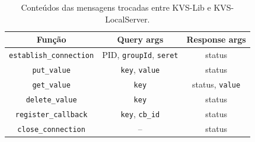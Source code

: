 \begin{table}[ht!]
    \centering
     \caption{Conteúdos das mensagens trocadas entre KVS-Lib e KVS-LocalServer.}
    \begin{tabular}{ccc}
    \hline
         Função &  Query args & Response args\\
         \hline
         \texttt{establish\_connection} & PID, \texttt{groupId}, \texttt{seret} & status \\
         \texttt{put\_value} & \texttt{key}, \texttt{value} & status\\
         \texttt{get\_value} & \texttt{key} & status, \texttt{value} \\
         \texttt{delete\_value} & \texttt{key} & status \\
         \texttt{register\_callback} & \texttt{key}, \texttt{cb\_id} & status \\
         \texttt{close\_connection} & -- & status \\
         \hline
    \end{tabular}
   
    \label{tab:args_query_resp}
\end{table}


